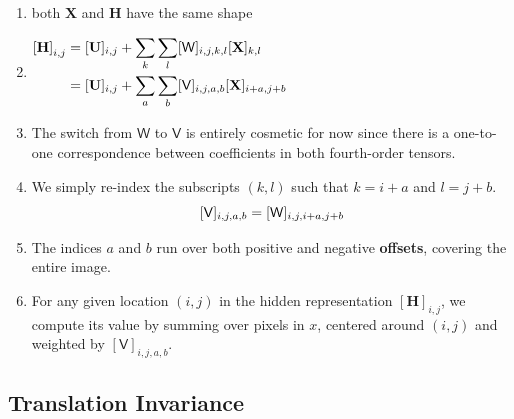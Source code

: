 \begin{enumerate}[itemsep=0.2cm]
    \item both $\mathbf{X}$ and $\mathbf{H}$ have the same shape

    \item[] 
    $
        \hfill
        \begin{aligned} 
        \left[\mathbf{H}\right]_{i, j} 
        &= [\mathbf{U}]_{i, j} + \dsum_k \dsum_l[\mathsf{W}]_{i, j, k, l}  [\mathbf{X}]_{k, l}\\ 
        &=  [\mathbf{U}]_{i, j} + \dsum_a \dsum_b [\mathsf{V}]_{i, j, a, b}  [\mathbf{X}]_{i+a, j+b}
        \end{aligned}
        \hfill
    $

    \item The switch from $\mathsf{W}$ to $\mathsf{V}$ is entirely cosmetic for now since there is a one-to-one correspondence between coefficients in both fourth-order tensors.

    \item We simply re-index the subscripts $(k, l)$ such that $k = i+a$ and $l = j+b$.
    \[
        \hfill
        [\mathsf{V}]_{i, j, a, b} = [\mathsf{W}]_{i, j, i+a, j+b}
        \hfill
    \]

    \item The indices $a$ and $b$ run over both positive and negative \textbf{offsets}, covering the entire image.

    \item For any given location $(i, j)$ in the hidden representation $[\mathbf{H}]_{i, j}$, we compute its value by summing over pixels in $x$, centered around $(i, j)$ and weighted by $[\mathsf{V}]_{i, j, a, b}$.

\end{enumerate}

\subsection{Translation Invariance \cite{dnn-1}}

